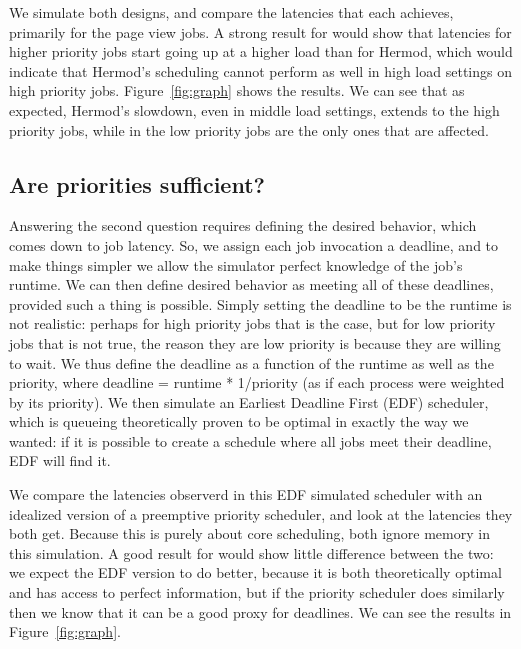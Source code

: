 We simulate both designs, and compare the latencies that each achieves,
primarily for the page view jobs. A strong result for \sys{} would show that
latencies for higher priority jobs start going up at a higher load than for
Hermod, which would indicate that Hermod's scheduling cannot perform as well in
high load settings on high priority jobs. Figure~\ref{fig:graph} shows the
results. We can see that as expected, Hermod's slowdown, even in middle load
settings, extends to the high priority jobs, while in \sys{} the low priority
jobs are the only ones that are affected.



\subsection{Are priorities sufficient?}

Answering the second question requires defining the desired behavior, which
comes down to job latency. So, we assign each job invocation a deadline, and to
make things simpler we allow the simulator perfect knowledge of the job's
runtime. We can then define desired behavior as meeting all of these deadlines,
provided such a thing is possible. Simply setting the deadline to be the runtime
is not realistic: perhaps for high priority jobs that is the case, but for low
priority jobs that is not true, the reason they are low priority is because they
are willing to wait. We thus define the deadline as a function of the runtime as
well as the priority, where deadline = runtime * 1/priority (as if each process
were weighted by its priority). We
then simulate an Earliest Deadline First (EDF) scheduler, which is queueing
theoretically proven to be optimal in exactly the way we wanted: if it is
possible to create a schedule where all jobs meet their deadline, EDF will find
it\cite{TODO}. 

We compare the latencies observerd in this EDF simulated scheduler with an
idealized version of a preemptive priority scheduler, and look at the latencies
they both get. Because this is purely about core scheduling, both ignore memory
in this simulation. A good result for \sys{} would show little difference
between the two: we expect the EDF version to do better, because it is both
theoretically optimal and has access to perfect information, but if the priority
scheduler does similarly then we know that it can be a good proxy for deadlines.
We can see the results in Figure~\ref{fig:graph}.


